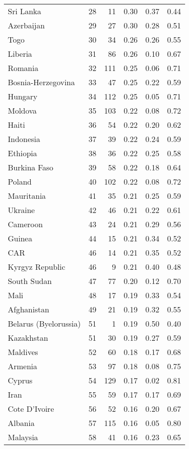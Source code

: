 \begin{longtable}[t]{lrrrrr}
Sri Lanka & 28 & 11 & 0.30 & 0.37 & 0.44\\
Azerbaijan & 29 & 27 & 0.30 & 0.28 & 0.51\\
Togo & 30 & 34 & 0.26 & 0.26 & 0.55\\
\addlinespace
Liberia & 31 & 86 & 0.26 & 0.10 & 0.67\\
Romania & 32 & 111 & 0.25 & 0.06 & 0.71\\
Bosnia-Herzegovina & 33 & 47 & 0.25 & 0.22 & 0.59\\
Hungary & 34 & 112 & 0.25 & 0.05 & 0.71\\
Moldova & 35 & 103 & 0.22 & 0.08 & 0.72\\
\addlinespace
Haiti & 36 & 54 & 0.22 & 0.20 & 0.62\\
Indonesia & 37 & 39 & 0.22 & 0.24 & 0.59\\
Ethiopia & 38 & 36 & 0.22 & 0.25 & 0.58\\
Burkina Faso & 39 & 58 & 0.22 & 0.18 & 0.64\\
Poland & 40 & 102 & 0.22 & 0.08 & 0.72\\
\addlinespace
Mauritania & 41 & 35 & 0.21 & 0.25 & 0.59\\
Ukraine & 42 & 46 & 0.21 & 0.22 & 0.61\\
Cameroon & 43 & 24 & 0.21 & 0.29 & 0.56\\
Guinea & 44 & 15 & 0.21 & 0.34 & 0.52\\
CAR & 46 & 14 & 0.21 & 0.35 & 0.52\\
\addlinespace
Kyrgyz Republic & 46 & 9 & 0.21 & 0.40 & 0.48\\
South Sudan & 47 & 77 & 0.20 & 0.12 & 0.70\\
Mali & 48 & 17 & 0.19 & 0.33 & 0.54\\
Afghanistan & 49 & 21 & 0.19 & 0.32 & 0.55\\
Belarus (Byelorussia) & 51 & 1 & 0.19 & 0.50 & 0.40\\
\addlinespace
Kazakhstan & 51 & 30 & 0.19 & 0.27 & 0.59\\
Maldives & 52 & 60 & 0.18 & 0.17 & 0.68\\
Armenia & 53 & 97 & 0.18 & 0.08 & 0.75\\
Cyprus & 54 & 129 & 0.17 & 0.02 & 0.81\\
Iran & 55 & 59 & 0.17 & 0.17 & 0.69\\
\addlinespace
Cote D'Ivoire & 56 & 52 & 0.16 & 0.20 & 0.67\\
Albania & 57 & 115 & 0.16 & 0.05 & 0.80\\
Malaysia & 58 & 41 & 0.16 & 0.23 & 0.65\\

\end{longtable}
